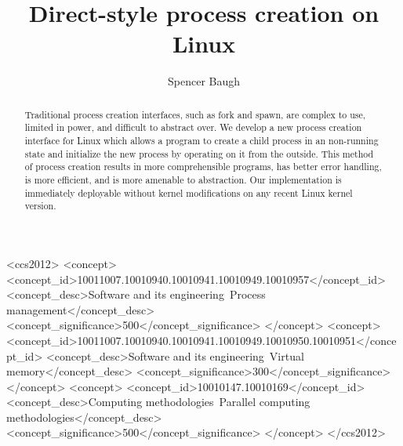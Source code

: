\documentclass[sigplan]{acmart}
\begin{document}
\title[Direct-style process creation on Linux]{Direct-style process creation on Linux}

\author{Spencer Baugh}

\begin{abstract}
Traditional process creation interfaces,
such as fork and spawn,
are complex to use, limited in power, and difficult to abstract over.
We develop a new process creation interface for Linux
which allows a program to create a child process in an non-running state
and initialize the new process by operating on it from the outside.
This method of process creation results in more comprehensible programs, 
has better error handling,
is more efficient,
and is more amenable to abstraction.
Our implementation is immediately deployable without kernel modifications on any recent Linux kernel version.
\end{abstract}

%
%
\begin{CCSXML}
<ccs2012>
   <concept>
       <concept_id>10011007.10010940.10010941.10010949.10010957</concept_id>
       <concept_desc>Software and its engineering~Process management</concept_desc>
       <concept_significance>500</concept_significance>
       </concept>
   <concept>
       <concept_id>10011007.10010940.10010941.10010949.10010950.10010951</concept_id>
       <concept_desc>Software and its engineering~Virtual memory</concept_desc>
       <concept_significance>300</concept_significance>
       </concept>
   <concept>
       <concept_id>10010147.10010169</concept_id>
       <concept_desc>Computing methodologies~Parallel computing methodologies</concept_desc>
       <concept_significance>500</concept_significance>
       </concept>
 </ccs2012>
\end{CCSXML}



\maketitle
\end{document}
